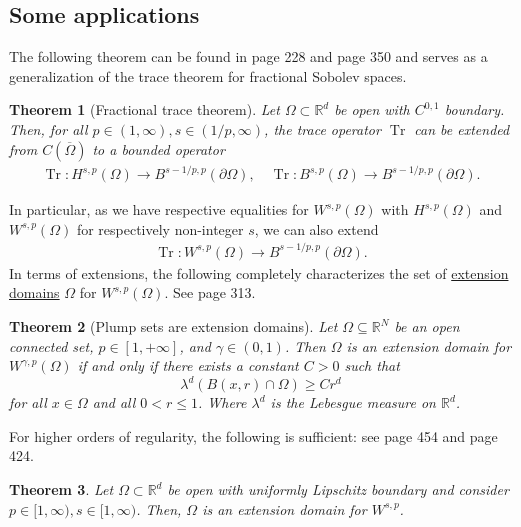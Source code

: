 \documentclass[
    a4paper,
    DIV=14,
    abstract=true,
    numbers=noenddot
]
{scrartcl}
\newtheorem{theorem}{Theorem}[section]
\theoremstyle{definition}
\newcommand{\R}{\mathbb{R}}
\begin{document}
\subsection{Some applications}
The following theorem can be found in \cite{agranovich2015sobolev} page 228 and \cite{leoni2023first} page 350 and serves as a generalization of the trace theorem for fractional Sobolev spaces.
\begin{theorem}[Fractional trace theorem]\label{trace theorem}
    Let $\Omega \subset \R^d$ be open with $C^{0,1}$ boundary. Then, for all  $p\in (1,\infty), s\in (1/p,\infty) $, the trace operator $\operatorname{Tr}$ can be extended from $C(\overline{\Omega } )$  to a bounded operator
    \begin{align*}
        \operatorname{Tr}: H^{s,p}(\Omega ) \to B^{s-1/p,p}(\partial\Omega), \quad \operatorname{Tr}: B^{s,p}(\Omega ) \to B^{s-1/p,p}(\partial\Omega).
    \end{align*}
\end{theorem}
In particular, as we have respective equalities for $W^{s,p}(\Omega )$ with $H^{s,p}(\Omega )$ and $W^{s,p}(\Omega )$ for respectively non-integer  $s$, we can also extend
\begin{align*}
    \operatorname{Tr}: W^{s,p}(\Omega ) \to B^{s-1/p,p}(\partial\Omega).
\end{align*}
In terms of extensions, the following completely characterizes the set of \href{https://nowheredifferentiable.com/2023-07-12-PDEs-3-Sobolev_spaces/#global:~:text=there%20exists%20a-,continuous,-operator}{extension domains} $\Omega $ for $W^{s,p}(\Omega )$. See \cite{leoni2017first} page 313.
\begin{theorem}[Plump sets are extension domains]\label{plump sets}
    Let $\Omega \subseteq \mathbb{R}^N$ be an open connected set, $p\in [1,+\infty]$, and $\gamma\in (0,1)$. Then $\Omega$ is an extension domain for $W^{\gamma, p}(\Omega)$ if and only if there exists a constant $C>0$ such that
    $$
        \lambda^d(B(x, r) \cap \Omega) \geq C r^d
    $$
    for all $x \in \Omega$ and all $0<r \leq 1$. Where $\lambda^d$ is the Lebesgue measure on $\R^d$.
\end{theorem}
For higher orders of regularity, the following is sufficient: see \cite{leoni2023first} page 454 and \cite{leoni2017first} page 424.
\begin{theorem}
    Let $\Omega \subset \R^d$ be open with uniformly Lipschitz boundary and consider   $p\in [1,\infty), s\in[1,\infty)$. Then, $\Omega $ is an extension domain for $W^{s,p}$.
\end{theorem}
\end{document}
